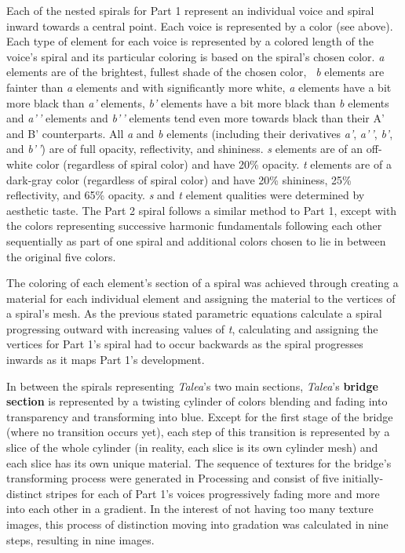 \documentclass[sigconf]{nimeart}
\begin{document}
Each of the nested spirals for Part 1 represent an individual voice and spiral inward towards a central point. Each voice is represented by a color (see above). Each type of element for each voice is represented by a colored length of the voice's spiral and its particular coloring is based on the spiral's chosen color. \emph{a} elements are of the brightest, fullest shade of the chosen color, \emph{~b} elements are fainter than \emph{a} elements and with significantly more white, \emph{a} elements have a bit more black than \emph{a'} elements, \emph{b'} elements have a bit more black than \emph{b} elements and \emph{a'\,'} elements and \emph{b'\,'} elements tend even more towards black than their A' and B' counterparts. All \emph{a} and \emph{b} elements (including their derivatives \emph{a'}, \emph{a'\,'}, \emph{b'}, and \emph{b'\,'}) are of full opacity, reflectivity, and shininess. \emph{s} elements are of an off-white color (regardless of spiral color) and have 20\% opacity. \emph{t} elements are of a dark-gray color (regardless of spiral color) and have 20\% shininess, 25\% reflectivity, and 65\% opacity. \emph{s} and \emph{t} element qualities were determined by aesthetic taste. The Part 2 spiral follows a similar method to Part 1, except with the colors representing successive harmonic fundamentals following each other sequentially as part of one spiral and additional colors chosen to lie in between the original five colors.~

The coloring of each element's section of a spiral was achieved through creating a material for each individual element and assigning the material to the vertices of a spiral's mesh. As the previous stated parametric equations calculate a spiral progressing outward with increasing values of \emph{t}, calculating and assigning the vertices for Part 1's spiral had to occur backwards as the spiral progresses inwards as it maps Part 1's development.

In between the spirals representing \emph{Talea}'s two main sections, \emph{Talea}'s \textbf{bridge section} is represented by a twisting cylinder of colors blending and fading into transparency and transforming into blue. Except for the first stage of the bridge (where no transition occurs yet), each step of this transition is represented by a slice of the whole cylinder (in reality, each slice is its own cylinder mesh) and each slice has its own unique material. The sequence of textures for the bridge's transforming process were generated in Processing and consist of five initially-distinct stripes for each of Part 1's voices progressively fading more and more into each other in a gradient. In the interest of not having too many texture images, this process of distinction moving into gradation was calculated in nine steps, resulting in nine images.
\end{document}
